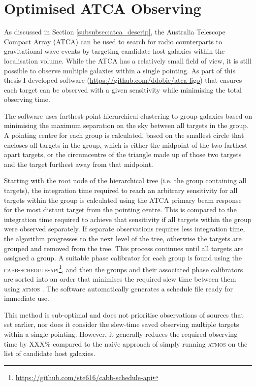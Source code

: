 \section{Optimised ATCA Observing}
As discussed in Section \ref{subsubsec:atca_descrip}, the Australia Telescope Compact Array (ATCA) can be used to search for radio counterparts to gravitational wave events by targeting candidate host galaxies within the localisation volume. While the ATCA has a relatively small field of view, it is still possible to observe multiple galaxies within a single pointing. As part of this thesis I developed software (\url{https://github.com/ddobie/atca-ligo}) that ensures each target can be observed with a given sensitivity while minimising the total observing time.

The software uses farthest-point hierarchical clustering \citep{voorhees1986implementing} to group galaxies based on minimising the maximum separation on the sky between all targets in the group. A pointing centre for each group is calculated, based on the smallest circle that encloses all targets in the group, which is either the midpoint of the two farthest apart targets, or the circumcentre of the triangle made up of those two targets and the target furthest away from that midpoint.

Starting with the root node of the hierarchical tree (i.e. the group containing all targets), the integration time required to reach an arbitrary sensitivity for all targets within the group is calculated using the ATCA primary beam response \citep{wieringa1992measurements} for the most distant target from the pointing centre. This is compared to the integration time required to achieve that sensitivity if all targets within the group were observed separately. If separate observations requires less integration time, the algorithm progresses to the next level of the tree, otherwise the targets are grouped and removed from the tree. This process continues until all targets are assigned a group. A suitable phase calibrator for each group is found using the \textsc{cabb-schedule-api}\footnote{\url{https://github.com/ste616/cabb-schedule-api}}, and then the groups and their associated phase calibrators are sorted into an order that minimises the required slew time between them using \textsc{atmos} \citep{1995ASPC...77..433S}. The software automatically generates a schedule file ready for immediate use.

This method is sub-optimal and does not prioritise observations of sources that set earlier, nor does it consider the slew-time saved observing multiple targets within a single pointing. However, it generally reduces the required observing time by XXX\% compared to the nai\"ve approach of simply running \textsc{atmos} on the list of candidate host galaxies.

